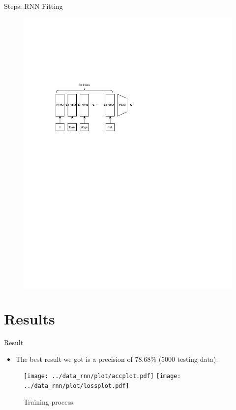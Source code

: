 \documentclass{beamer}
\begin{document}
\begin{frame}{Steps: RNN Fitting}

    \begin{figure}[h]
        \includegraphics[trim={1cm 12cm 0 6cm},clip]{img/rnn.pdf}
    \end{figure}
		
\end{frame}

\section{Results}%
\label{sec:results}
\begin{frame}{Result}
    \begin{itemize}
        \item The best result we got is a precision of 78.68\% (5000 testing data).
    \end{itemize}
    \begin{figure}[h]
        \centering
        \texttt{[image: ../data\_rnn/plot/accplot.pdf]}
        \texttt{[image: ../data\_rnn/plot/lossplot.pdf]}
        \caption{Training process.\label{fig:result}}
    \end{figure}

\end{frame}
\end{document}
